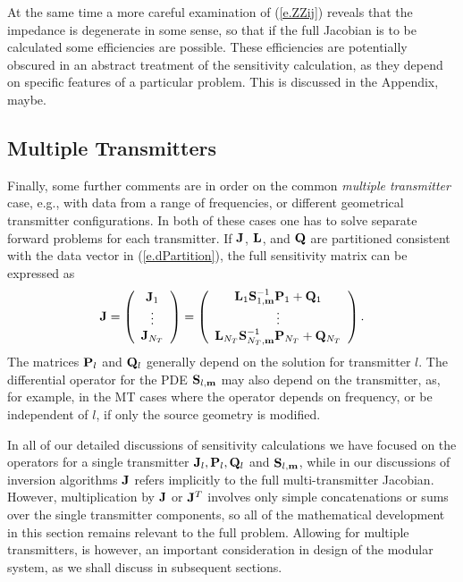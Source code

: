 At the same time a more careful examination of
(\ref{e.ZZij}) reveals that the impedance is degenerate in 
some sense, so that if the full Jacobian is to
be calculated some efficiencies are possible.
These efficiencies are potentially obscured in
an abstract treatment of the sensitivity calculation,
as they depend on specific features of a particular problem.
This is discussed in the Appendix, maybe.

\subsection{Multiple Transmitters}

Finally, some further comments are in order on 
the common {\it multiple transmitter} case,
e.g., with data from a range
of frequencies, 
or different geometrical transmitter configurations.
In both of these cases one has to solve separate forward
problems for each transmitter.
If ${\bf J}$, ${\bf L}$, and ${\bf Q}$ are partitioned consistent with
the data vector in (\ref{e.dPartition}),
the full sensitivity matrix can be expressed as 
\begin{equation}
\label{e.fullSens}
{\bf J} = \left(\begin{array}{c}
{\bf J}_1 \\ \vdots    \\ {\bf J}_{N_T}
\end{array} \right) =
\left(\begin{array}{c}
{\bf L}_1{\bf S}_{1,{\bf m}}^{-1} {\bf P}_1 + {\bf Q}_1 \\ \vdots
 \\ {\bf L}_{N_T} {\bf S}_{{N_T},{\bf m}}^{-1} {\bf P}_{N_T} + {\bf Q}_{N_T}
\end{array} \right) .
\end{equation}
The matrices
${\bf P}_l$ and ${\bf Q}_l$ generally depend on the solution
for transmitter $l$.  The differential operator
for  the PDE ${\bf S}_{l,{\bf m}}$ may also depend on
the transmitter, as, for example, in the MT cases
where the operator depends on frequency,
or be independent of $l$, if only the source geometry is modified.

In all of our detailed discussions of sensitivity
calculations we have focused on the operators for a single transmitter
${\bf J}_l, {\bf P}_l, {\bf Q}_l$ and ${\bf S}_{l,{\bf m}}$,
while in our discussions of inversion algorithms
${\bf J}$ refers implicitly to the full multi-transmitter Jacobian.
However, multiplication by ${\bf J}$ or ${\bf J}^T$ involves
only simple concatenations or sums over the single
transmitter components, so all of the 
mathematical development in this section
remains relevant to the full problem.
Allowing for multiple transmitters, is however,
an important consideration in design of the
modular system, as we shall discuss in subsequent sections.
